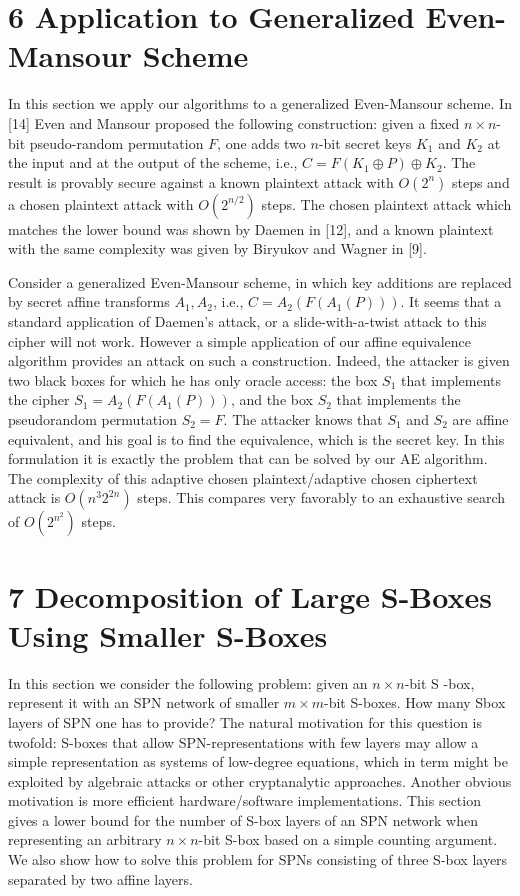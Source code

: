 \documentclass[10pt]{article}
\begin{document}
\section*{6 Application to Generalized Even-Mansour Scheme}
In this section we apply our algorithms to a generalized Even-Mansour scheme. In [14] Even and Mansour proposed the following construction: given a fixed $n \times n$-bit pseudo-random permutation $F$, one adds two $n$-bit secret keys $K_{1}$ and $K_{2}$ at the input and at the output of the scheme, i.e., $C=F\left(K_{1} \oplus P\right) \oplus K_{2}$. The result is provably secure against a known plaintext attack with $O\left(2^{n}\right)$ steps and a chosen plaintext attack with $O\left(2^{n / 2}\right)$ steps. The chosen plaintext attack which matches the lower bound was shown by Daemen in [12], and a known plaintext with the same complexity was given by Biryukov and Wagner in [9].

Consider a generalized Even-Mansour scheme, in which key additions are replaced by secret affine transforms $A_{1}, A_{2}$, i.e., $C=A_{2}\left(F\left(A_{1}(P)\right)\right)$. It seems that a standard application of Daemen's attack, or a slide-with-a-twist attack to this cipher will not work. However a simple application of our affine equivalence\\
algorithm provides an attack on such a construction. Indeed, the attacker is given two black boxes for which he has only oracle access: the box $S_{1}$ that implements the cipher $S_{1}=A_{2}\left(F\left(A_{1}(P)\right)\right)$, and the box $S_{2}$ that implements the pseudorandom permutation $S_{2}=F$. The attacker knows that $S_{1}$ and $S_{2}$ are affine equivalent, and his goal is to find the equivalence, which is the secret key. In this formulation it is exactly the problem that can be solved by our AE algorithm. The complexity of this adaptive chosen plaintext/adaptive chosen ciphertext attack is $O\left(n^{3} 2^{2 n}\right)$ steps. This compares very favorably to an exhaustive search of $O\left(2^{n^{2}}\right)$ steps.

\section*{7 Decomposition of Large S-Boxes Using Smaller S-Boxes}
In this section we consider the following problem: given an $n \times n$-bit S -box, represent it with an SPN network of smaller $m \times m$-bit S-boxes. How many Sbox layers of SPN one has to provide? The natural motivation for this question is twofold: S-boxes that allow SPN-representations with few layers may allow a simple representation as systems of low-degree equations, which in term might be exploited by algebraic attacks or other cryptanalytic approaches. Another obvious motivation is more efficient hardware/software implementations. This section gives a lower bound for the number of S-box layers of an SPN network when representing an arbitrary $n \times n$-bit S-box based on a simple counting argument. We also show how to solve this problem for SPNs consisting of three S-box layers separated by two affine layers.
\end{document}
